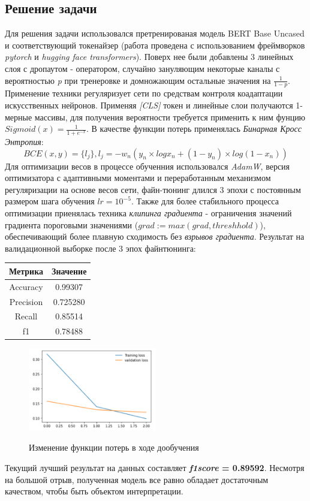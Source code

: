 \subsection{Решение задачи}
Для решения задачи использовался претренированая модель BERT Base Uncased и соответствующий токенайзер (работа проведена с использованием фреймворков \textit{pytorch} и \textit{hugging face transformers}). Поверх нее были добавлены 3 линейных слоя с дропаутом - оператором, случайно зануляющим некоторые каналы с вероятностью \textit{p} при тренеровке и домножающим остальные значения на $\frac{1}{1-p}$. Применение техники регуляризует сети по средствам контроля коадаптации искусственных нейронов.
\newline
Применяя \textit{[CLS]} токен и линейные слои получаются 1-мерные массивы, для получения вероятности требуется применить к ним фунцию $Sigmoid(x) = \frac{1}{1+e^{-x}}$. В качестве функции потерь применялась \textit{Бинарная Кросс Энтропия}:
\begin{equation} \label{BCE}
    BCE(x,y)=\{l_{j}\}, l_{j} = −w_{n}\left(y_{n}\times log x_{n}+(1−y_{n})\times log (1 - x_{n})\right)
\end{equation}
Для оптимизации весов в процессе обученния использовался \textit{AdamW}, версия оптимизатора с адаптивными моментами и переработанным механизмом регуляризации на основе весов сети, файн-тюнинг длился 3 эпохи с постоянным размером шага обучения $lr=10^{-5}$. Также для более стабильного процесса оптимизации приенялась техника \textit{клипинга градиента} - ограничения значений градиента пороговыми значениями ($grad := max(grad, threshhold)$), обеспечивающий более плавную сходимость без \textit{взрывов градиента}.
Результат на валидационной выборке после 3 эпох файнтюнинга:
\begin{center}
\begin{tabular}{ |c|c| } 
 \hline
 Метрика & Значение\\ 
 \hline
 Accuracy & 0.99307\\ 
 \hline
 Precision & 0.725280\\ 
 \hline
  Recall & 0.85514\\ 
 \hline
  f1 & 0.78488\\ 
 \hline
\end{tabular}
\end{center}

\begin{figure}[h]
\caption{Изменение функции потерь в ходе дообучения}
\centering
\includegraphics[width=0.5\textwidth]{loss_bert.png}
\label{loss}
\end{figure}
\newline
Текущий лучший результат на данных составляет \textbf{\textit{f1score} = 0.89592}. Несмотря на большой отрыв, полученная модель все равно обладает достаточным качеством, чтобы быть объектом интерпретации.
